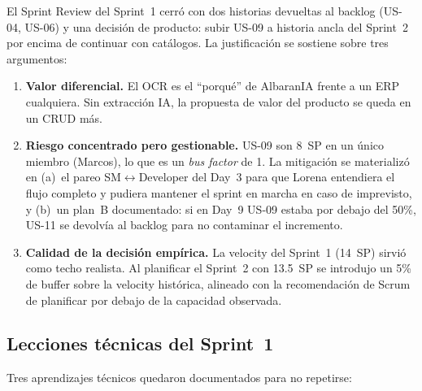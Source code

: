 El Sprint Review del Sprint~1 cerró con dos historias devueltas al backlog (US-04, US-06) y una decisión de producto: subir US-09 a historia ancla del Sprint~2 por encima de continuar con catálogos. La justificación se sostiene sobre tres argumentos:

\begin{enumerate}
\item \textbf{Valor diferencial.} El OCR es el ``porqué'' de AlbaranIA frente a un ERP cualquiera. Sin extracción IA, la propuesta de valor del producto se queda en un CRUD más.
\item \textbf{Riesgo concentrado pero gestionable.} US-09 son 8~SP en un único miembro (Marcos), lo que es un \emph{bus factor} de 1. La mitigación se materializó en (a)~el pareo SM$\leftrightarrow$Developer del Day~3 para que Lorena entendiera el flujo completo y pudiera mantener el sprint en marcha en caso de imprevisto, y (b)~un plan~B documentado: si en Day~9 US-09 estaba por debajo del 50\%, US-11 se devolvía al backlog para no contaminar el incremento.
\item \textbf{Calidad de la decisión empírica.} La velocity del Sprint~1 (14~SP) sirvió como techo realista. Al planificar el Sprint~2 con 13.5~SP se introdujo un 5\% de buffer sobre la velocity histórica, alineado con la recomendación de Scrum de planificar por debajo de la capacidad observada.
\end{enumerate}

\subsection{Lecciones técnicas del Sprint~1}

Tres aprendizajes técnicos quedaron documentados para no repetirse:

